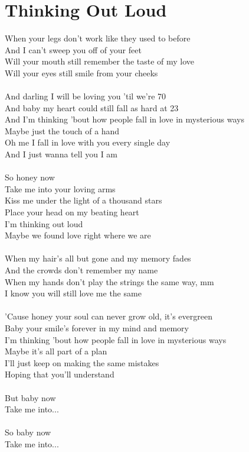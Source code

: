 \section{Thinking Out Loud}
When your legs don't work like they used to before\\
And I can't sweep you off of your feet\\
Will your mouth still remember the taste of my love\\
Will your eyes still smile from your cheeks\\
\\
And darling I will be loving you 'til we're 70\\
And baby my heart could still fall as hard at 23\\
And I'm thinking 'bout how people fall in love in mysterious ways\\
Maybe just the touch of a hand\\
Oh me I fall in love with you every single day\\
And I just wanna tell you I am\\
\\
So honey now\\
Take me into your loving arms\\
Kiss me under the light of a thousand stars\\
Place your head on my beating heart\\
I'm thinking out loud\\
Maybe we found love right where we are\\
\\
When my hair's all but gone and my memory fades\\
And the crowds don't remember my name\\
When my hands don't play the strings the same way, mm\\
I know you will still love me the same\\
\\
'Cause honey your soul can never grow old, it's evergreen\\
Baby your smile's forever in my mind and memory\\
I'm thinking 'bout how people fall in love in mysterious ways\\
Maybe it's all part of a plan\\
I'll just keep on making the same mistakes\\
Hoping that you'll understand\\
\\
But baby now\\
Take me into...\\
\\
So baby now\\
Take me into...\\
